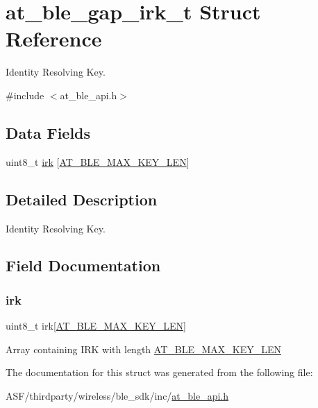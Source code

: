 \hypertarget{structat__ble__gap__irk__t}{}\section{at\+\_\+ble\+\_\+gap\+\_\+irk\+\_\+t Struct Reference}
\label{structat__ble__gap__irk__t}


Identity Resolving Key.  




{\ttfamily \#include $<$at\+\_\+ble\+\_\+api.\+h$>$}

\subsection*{Data Fields}
\begin{DoxyCompactItemize}
\item 
uint8\+\_\+t \mbox{\hyperlink{structat__ble__gap__irk__t_a6976ea27c8e6eefa6ee513454dad7faa}{irk}} \mbox{[}\mbox{\hyperlink{at__ble__api_8h_a462eb50567c44d7284308fe058158e99}{A\+T\+\_\+\+B\+L\+E\+\_\+\+M\+A\+X\+\_\+\+K\+E\+Y\+\_\+\+L\+EN}}\mbox{]}
\end{DoxyCompactItemize}


\subsection{Detailed Description}
Identity Resolving Key. 

\subsection{Field Documentation}
\mbox{\label{structat__ble__gap__irk__t_a6976ea27c8e6eefa6ee513454dad7faa}} 
\subsubsection{\texorpdfstring{irk}{irk}}
{\footnotesize\ttfamily uint8\+\_\+t irk\mbox{[}\mbox{\hyperlink{at__ble__api_8h_a462eb50567c44d7284308fe058158e99}{A\+T\+\_\+\+B\+L\+E\+\_\+\+M\+A\+X\+\_\+\+K\+E\+Y\+\_\+\+L\+EN}}\mbox{]}}

Array containing I\+RK with length \mbox{\hyperlink{at__ble__api_8h_a462eb50567c44d7284308fe058158e99}{A\+T\+\_\+\+B\+L\+E\+\_\+\+M\+A\+X\+\_\+\+K\+E\+Y\+\_\+\+L\+EN}} 

The documentation for this struct was generated from the following file\+:\begin{DoxyCompactItemize}
\item 
A\+S\+F/thirdparty/wireless/ble\+\_\+sdk/inc/\mbox{\hyperlink{at__ble__api_8h}{at\+\_\+ble\+\_\+api.\+h}}\end{DoxyCompactItemize}
